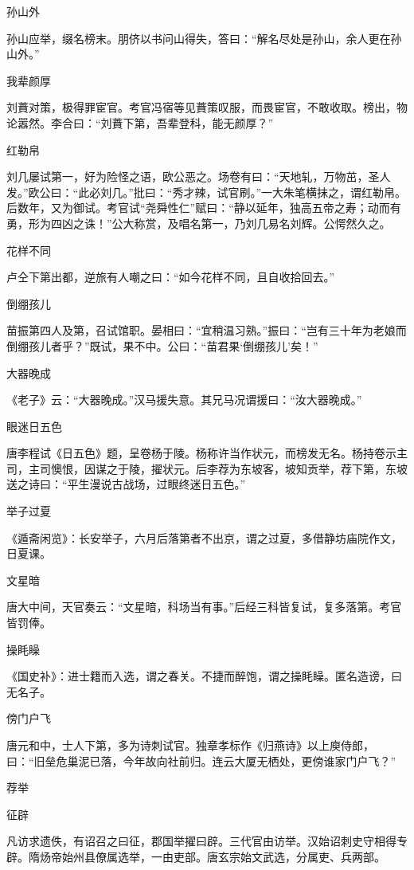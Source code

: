 \documentclass[a4paper,12pt,UTF8,twoside]{ctexbook}
\begin{document}
    孙山外
    
    孙山应举，缀名榜末。朋侪以书问山得失，答曰：“解名尽处是孙山，余人更在孙山外。”
    
    我辈颜厚
    
    刘蕡对策，极得罪宦官。考官冯宿等见蕡策叹服，而畏宦官，不敢收取。榜出，物论嚣然。李合曰：“刘蕡下第，吾辈登科，能无颜厚？”
    
    红勒帛
    
    刘几屡试第一，好为险怪之语，欧公恶之。场卷有曰：“天地轧，万物茁，圣人发。”欧公曰：“此必刘几。”批曰：“秀才辣，试官刷。”一大朱笔横抹之，谓红勒帛。后数年，又为御试。考官试“尧舜性仁”赋曰：“静以延年，独高五帝之寿；动而有勇，形为四凶之诛！”公大称赏，及唱名第一，乃刘几易名刘辉。公愕然久之。
    
    花样不同
    
    卢仝下第出都，逆旅有人嘲之曰：“如今花样不同，且自收拾回去。”
    
    倒绷孩儿
    
    苗振第四人及第，召试馆职。晏相曰：“宜稍温习熟。”振曰：“岂有三十年为老娘而倒绷孩儿者乎？”既试，果不中。公曰：“苗君果‘倒绷孩儿’矣！”
    
    大器晚成
    
    《老子》云：“大器晚成。”汉马援失意。其兄马况谓援曰：“汝大器晚成。”
    
    眼迷日五色
    
    唐李程试《日五色》题，呈卷杨于陵。杨称许当作状元，而榜发无名。杨持卷示主司，主司懊恨，因谋之于陵，擢状元。后李荐为东坡客，坡知贡举，荐下第，东坡送之诗曰：“平生漫说古战场，过眼终迷日五色。”
    
    举子过夏
    
    《遁斋闲览》：长安举子，六月后落第者不出京，谓之过夏，多借静坊庙院作文，日夏课。
    
    文星暗
    
    唐大中间，天官奏云：“文星暗，科场当有事。”后经三科皆复试，复多落第。考官皆罚俸。
    
    操眊矂
    
    《国史补》：进士籍而入选，谓之春关。不捷而醉饱，谓之操眊矂。匿名造谤，曰无名子。
    
    傍门户飞
    
    唐元和中，士人下第，多为诗刺试官。独章孝标作《归燕诗》以上庾侍郎，曰：“旧垒危巢泥已落，今年故向社前归。连云大厦无栖处，更傍谁家门户飞？”
    
    荐举
    
    征辟
    
    凡访求遗佚，有诏召之曰征，郡国举擢曰辟。三代官由访举。汉始诏刺史守相得专辟。隋炀帝始州县僚属选举，一由吏部。唐玄宗始文武选，分属吏、兵两部。
    
\end{document}

